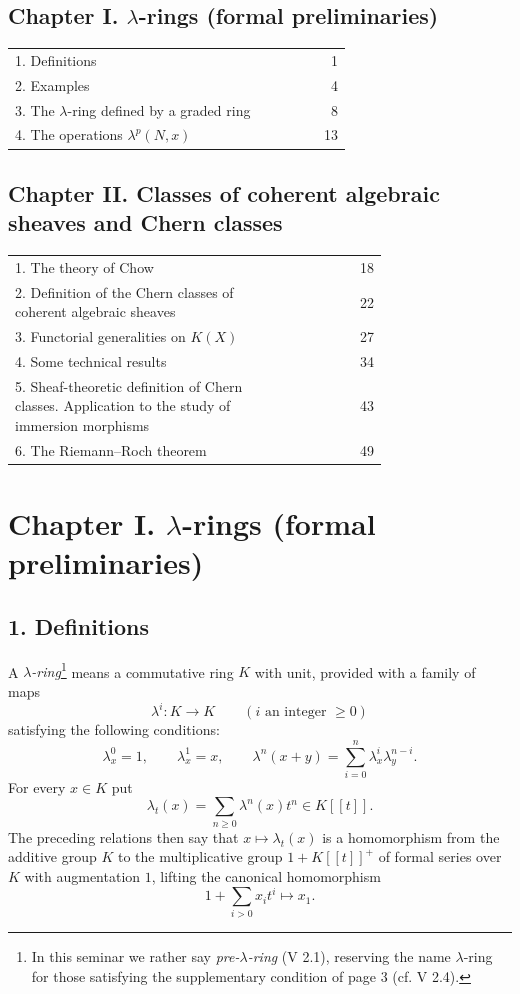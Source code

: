 \documentclass[11pt]{article}
\begin{document}
\subsection*{Chapter I. $\lambda$-rings (formal preliminaries)}
\begin{longtable}{@{}p{0.74\linewidth}r@{}}
1. Definitions & 1\\
2. Examples & 4\\
3. The $\lambda$-ring defined by a graded ring & 8\\
4. The operations $\lambda^p(N,x)$ & 13\\
\end{longtable}

\subsection*{Chapter II. Classes of coherent algebraic sheaves and Chern classes}
\begin{longtable}{@{}p{0.74\linewidth}r@{}}
1. The theory of Chow & 18\\
2. Definition of the Chern classes of coherent algebraic sheaves & 22\\
3. Functorial generalities on $K(X)$ & 27\\
4. Some technical results & 34\\
5. Sheaf-theoretic definition of Chern classes. Application to the study of immersion morphisms & 43\\
6. The Riemann--Roch theorem & 49
\end{longtable}

\section*{Chapter I. $\lambda$-rings (formal preliminaries)}

\subsection*{1. Definitions}

A \emph{$\lambda$-ring}\footnote{In this seminar we rather say \emph{pre-$\lambda$-ring} (V 2.1), reserving the name $\lambda$-ring for those satisfying the supplementary condition of page 3 (cf. V 2.4).} means a commutative ring $K$ with unit, provided with a family of maps
\begin{equation}\tag{1.1}
\lambda^i:K\longrightarrow K\qquad (i\text{ an integer }\geq 0)
\end{equation}
satisfying the following conditions:
\begin{equation}\tag{1.2}
\lambda_x^0=1,\qquad \lambda_x^1=x,\qquad
\lambda^n(x+y)=\sum_{i=0}^n \lambda^i_x\lambda^{n-i}_y .
\end{equation}
For every $x\in K$ put
\begin{equation}\tag{1.3}
\lambda_t(x)=\sum_{n\geq 0}\lambda^n(x)t^n\in K[[t]].
\end{equation}
The preceding relations then say that $x\mapsto \lambda_t(x)$ is a homomorphism from the additive group $K$ to the multiplicative group $1+K[[t]]^+$ of formal series over $K$ with augmentation $1$, lifting the canonical homomorphism
\[
1+\sum_{i>0}x_it^i\longmapsto x_1.
\]
\end{document}
